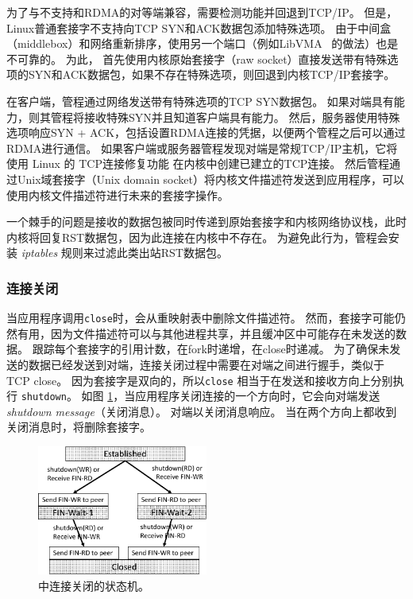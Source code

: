为了与不支持\sys {}和RDMA的对等端兼容，需要检测\sys {}功能并回退到TCP/IP。
但是，Linux普通套接字不支持向TCP SYN和ACK数据包添加特殊选项。
由于中间盒（middlebox）和网络重新排序，使用另一个端口（例如LibVMA~ \cite {libvma} 的做法）也是不可靠的。
为此，\libipc{} 首先使用内核原始套接字（raw socket）直接发送带有特殊选项的SYN和ACK数据包，如果不存在特殊选项，则回退到内核TCP/IP套接字。

在客户端，管程通过网络发送带有特殊选项的TCP SYN数据包。
如果对端具有\sys {}能力，则其管程将接收特殊SYN并且知道客户端具有\sys {}能力。
然后，服务器使用特殊选项响应SYN + ACK，包括设置RDMA连接的凭据，以便两个管程之后可以通过RDMA进行通信。
如果客户端或服务器管程发现对端是常规TCP/IP主机，它将使用 Linux 的 TCP连接修复功能 \cite {tcp-connection-repair} 在内核中创建已建立的TCP连接。
然后管程通过Unix域套接字（Unix domain socket）将内核文件描述符发送到应用程序，\libipc {}可以使用内核文件描述符进行未来的套接字操作。


一个棘手的问题是接收的数据包被同时传递到原始套接字和内核网络协议栈，此时内核将回复RST数据包，因为此连接在内核中不存在。
为避免此行为，管程会安装 \emph {iptables} 规则来过滤此类出站RST数据包。



\subsubsection{连接关闭}



当应用程序调用\texttt {close}时，\libipc {}会从重映射表中删除文件描述符。
然而，套接字可能仍然有用，因为文件描述符可以与其他进程共享，并且缓冲区中可能存在未发送的数据。
\libipc{} 跟踪每个套接字的引用计数，在fork时递增，在close时递减。
为了确保未发送的数据已经发送到对端，连接关闭过程中需要在对端之间进行握手，类似于TCP close。
因为套接字是双向的，所以\texttt {close} 相当于在发送和接收方向上分别执行 \texttt {shutdown}。
如图 \ref{socksdirect:fig:conn-close}，当应用程序关闭连接的一个方向时，它会向对端发送 \emph {shutdown message}（关闭消息）。
对端以关闭消息响应。
当\libipc {}在两个方向上都收到关闭消息时，将删除套接字。


\begin{figure}[htbp]
	\centering
	\includegraphics[width=0.5\textwidth]{images/conn-close-new}	
	\caption{\libipc{} 中连接关闭的状态机。}
	\label{socksdirect:fig:conn-close}
\end{figure}


